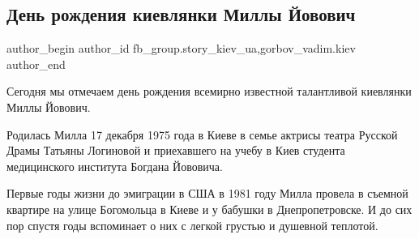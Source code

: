  
 
 
 
 
 
\subsection{День рождения киевлянки Миллы Йовович}
\label{sec:17_12_2021.fb.fb_group.story_kiev_ua.2.milla_jovovich_birthday}
 
\ifcmt
 author_begin
   author_id fb_group.story_kiev_ua,gorbov_vadim.kiev
 author_end
\fi


Сегодня мы отмечаем день рождения всемирно известной талантливой киевлянки
Миллы Йовович. 

Родилась Милла  17 декабря 1975 года в Киеве в семье актрисы театра Русской
Драмы Татьяны Логиновой и приехавшего на учебу в Киев студента  медицинского
института Богдана Йововича. 

Первые годы жизни до эмиграции в США в 1981 году Милла провела в съемной
квартире  на улице Богомольца в Киеве и у бабушки в Днепропетровске.  И до сих
пор спустя годы вспоминает о них с легкой грустью и душевной теплотой.

